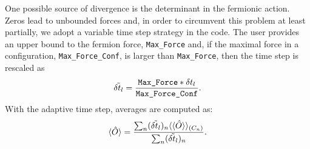 One possible source of divergence is the determinant in the fermionic action. Zeros lead to unbounded forces and, in order to circumvent this problem at least partially, we adopt a variable time step strategy in the code.  The user   provides an upper bound to the fermion force, \texttt{Max\_Force} and, if the maximal force in a configuration, \texttt{Max\_Force\_Conf}, is larger than \texttt{Max\_Force}, then the time step is rescaled as 
\begin{equation}
     \tilde{\delta t_{l}}   =  \frac{ \texttt{Max\_Force} *  \delta t_{l} }{\texttt{Max\_Force\_Conf}}.
\end{equation}
With the adaptive time  step,  averages are computed as: 
\begin{equation}
   \langle \hat{O} \rangle = \frac{ \sum_n (  \tilde{\delta t_{l}}  )_n \langle \langle \hat{O} \rangle   \rangle_{(C_n)}} {\sum_n (  \tilde{\delta t_{l}}  )_n }. 
\end{equation}


